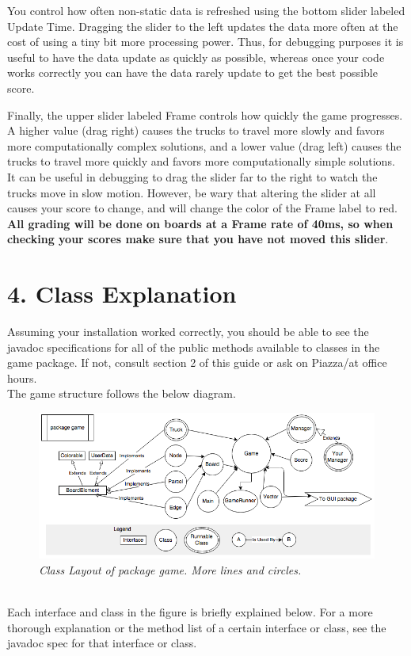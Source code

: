 \documentclass[11pt]{article}
\begin{document}
You control how often non-static data is refreshed using the bottom slider labeled Update Time. Dragging the slider to the left updates the data more often at the cost of using a tiny bit more processing power. Thus, for debugging purposes it is useful to have the data update as quickly as possible, whereas once your code works correctly you can have the data rarely update to get the best possible score.

Finally, the upper slider labeled Frame controls how quickly the game progresses. A higher value (drag right) causes the trucks to travel more slowly and favors more computationally complex solutions, and a lower value (drag left) causes the trucks to travel more quickly and favors more computationally simple solutions. It can be useful in debugging to drag the slider far to the right to watch the trucks move in slow motion. However, be wary that altering the slider at all causes your score to change, and will change the color of the Frame label to red. \textbf{All grading will be done on boards at a Frame rate of 40ms, so when checking your scores make sure that you have not moved this slider}.

\newpage
\section{4. Class Explanation}
Assuming your installation worked correctly, you should be able to see the javadoc specifications for all of the public methods available to classes in the game package. If not, consult section 2 of this guide or ask on Piazza/at office hours.\\
The game structure follows the below diagram.
\begin{figure}[h]
\centerline{\includegraphics[scale=0.7]{hirearchy.png}} 
\caption{\em{Class Layout of package game. More lines and circles.}}
\end{figure}
\\Each interface and class in the figure is briefly explained below. For a more thorough  explanation or the method list of a certain interface or class, see the javadoc spec for that interface or class.
\end{document}
